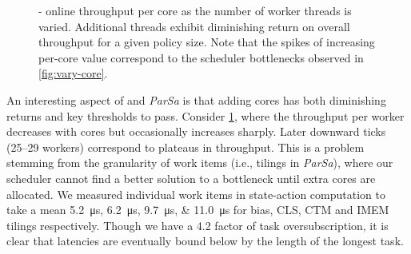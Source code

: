 \begin{figure}
	\caption[\approachshort{}-\coopfw{}'s online throughput per core as the number of worker threads is varied.]{\approachshort{}-\coopfw{} online throughput per core as the number of worker threads is varied. Additional threads exhibit diminishing return on overall throughput for a given policy size. Note that the spikes of increasing per-core value correspond to the scheduler bottlenecks observed in \cref{fig:vary-core}.\label{fig:tput-per-core}}
\end{figure}

An interesting aspect of \Coopfw{} and \emph{ParSa} is that adding cores has both diminishing returns and key thresholds to pass.
Consider \cref{fig:tput-per-core}, where the throughput per worker decreases with cores but occasionally increases sharply.
Later downward ticks (\numrange{25}{29} workers) correspond to plateaus in throughput.
This is a problem stemming from the granularity of work items (i.e., tilings in \emph{ParSa}), where our scheduler cannot find a better solution to a bottleneck until extra cores are allocated.
We measured individual work items in state-action computation to take a mean \qtylist{5.2; 6.2; 9.7; 11.0}{\micro\second} for bias, CLS, CTM and IMEM tilings respectively.
Though we have a \qty{4.2}{\times} factor of task oversubscription, it is clear that latencies are eventually bound below by the length of the longest task.

